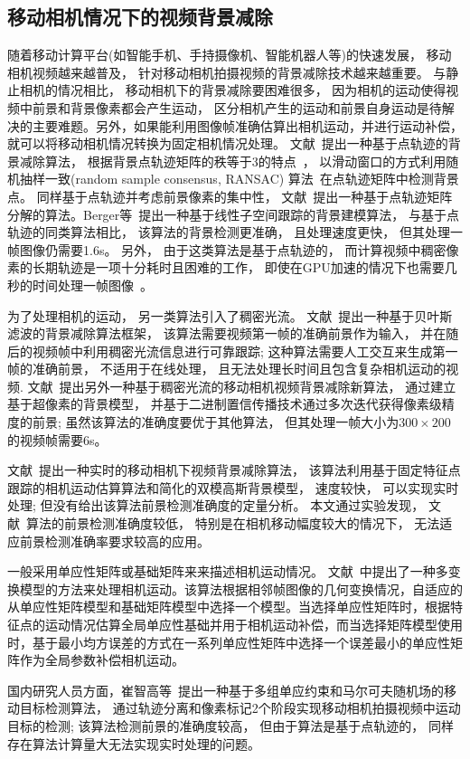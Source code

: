 \subsection{移动相机情况下的视频背景减除}
\label{sec:movingCamera}
随着移动计算平台(如智能手机、手持摄像机、智能机器人等)的快速发展， 移动相机视频越来越普及， 针对移动相机拍摄视频的背景减除技术越来越重要。 与静止相机的情况相比， 移动相机下的背景减除要困难很多， 因为相机的运动使得视频中前景和背景像素都会产生运动， 区分相机产生的运动和前景自身运动是待解决的主要难题。另外，如果能利用图像帧准确估算出相机运动，并进行运动补偿，就可以将移动相机情况转换为固定相机情况处理。
 文献~\cite{iccv2009}提出一种基于点轨迹的背景减除算法， 根据背景点轨迹矩阵的秩等于3的特点~\cite{Tomasi_1992}， 以滑动窗口的方式利用随机抽样一致(random sample consensus, RANSAC) 算法~\cite{Ransac}在点轨迹矩阵中检测背景点。 同样基于点轨迹并考虑前景像素的集中性， 文献~\cite{Cui2012}提出一种基于点轨迹矩阵分解的算法。Berger等~\cite{SubspaceTracking}提出一种基于线性子空间跟踪的背景建模算法， 与基于点轨迹的同类算法相比， 该算法的背景检测更准确， 且处理速度更快， 但其处理一帧图像仍需要1.6s。 另外， 由于这类算法是基于点轨迹的， 而计算视频中稠密像素的长期轨迹是一项十分耗时且困难的工作， 即使在GPU加速的情况下也需要几秒的时间处理一帧图像~\cite{ECCV10DensePonintTrajectories}。\par

为了处理相机的运动， 另一类算法引入了稠密光流。 文献~\cite{kwak2011Generalized}提出一种基于贝叶斯滤波的背景减除算法框架， 该算法需要视频第一帧的准确前景作为输入， 并在随后的视频帧中利用稠密光流信息进行可靠跟踪; 这种算法需要人工交互来生成第一帧的准确前景， 不适用于在线处理， 且无法处理长时间且包含复杂相机运动的视频. 文献~\cite{gbsuperpixel}提出另外一种基于稠密光流的移动相机视频背景减除新算法， 通过建立基于超像素的背景模型， 并基于二进制置信传播技术通过多次迭代获得像素级精度的前景; 虽然该算法的准确度要优于其他算法， 但其处理一帧大小为$300\times200$的视频帧需要6s。\par
文献~\cite{5.8s}提出一种实时的移动相机下视频背景减除算法， 该算法利用基于固定特征点跟踪的相机运动估算算法和简化的双模高斯背景模型， 速度较快， 可以实现实时处理; 但没有给出该算法前景检测准确度的定量分析。 本文通过实验发现， 文献~\cite{5.8s}算法的前景检测准确度较低， 特别是在相机移动幅度较大的情况下， 无法适应前景检测准确率要求较高的应用。\par
一般采用单应性矩阵或基础矩阵来来描述相机运动情况。 文献~中提出了一种多变换模型的方法来处理相机运动。该算法根据相邻帧图像的几何变换情况，自适应的从单应性矩阵模型和基础矩阵模型中选择一个模型。当选择单应性矩阵时，根据特征点的运动情况估算全局单应性基础并用于相机运动补偿，而当选择矩阵模型使用时，基于最小均方误差的方式在一系列单应性矩阵中选择一个误差最小的单应性矩阵作为全局参数补偿相机运动。\par
国内研究人员方面，崔智高等~\cite{czg}提出一种基于多组单应约束和马尔可夫随机场的移动目标检测算法， 通过轨迹分离和像素标记2个阶段实现移动相机拍摄视频中运动目标的检测; 该算法检测前景的准确度较高， 但由于算法是基于点轨迹的， 同样存在算法计算量大无法实现实时处理的问题。



